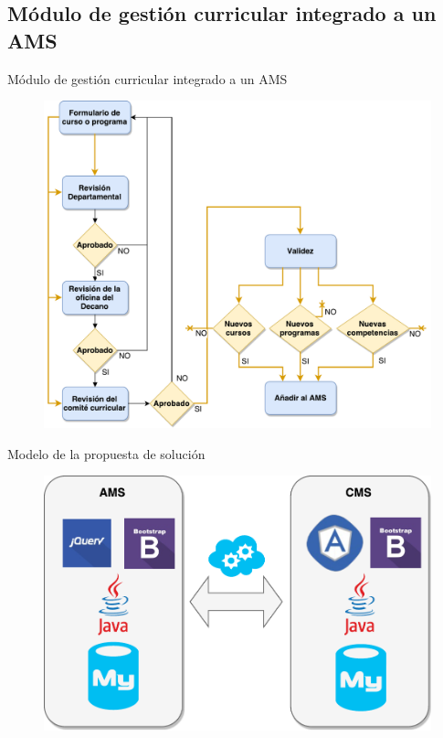 \documentclass[10pt,xcolor=table]{beamer}
\begin{document}
\subsection{Módulo de gestión curricular integrado a un AMS}
\begin{frame}{Módulo de gestión curricular integrado a un AMS}
	\begin{figure}
		\centering
	    \includegraphics[scale=0.35]{../Figuras/proposal}
	\end{figure}
\end{frame}


\begin{frame}{Modelo de la propuesta de solución}
	\begin{figure}
		\centering
	    \includegraphics[scale=0.55]{../Figuras/architecture}
	\end{figure}
\end{frame}
\end{document}
